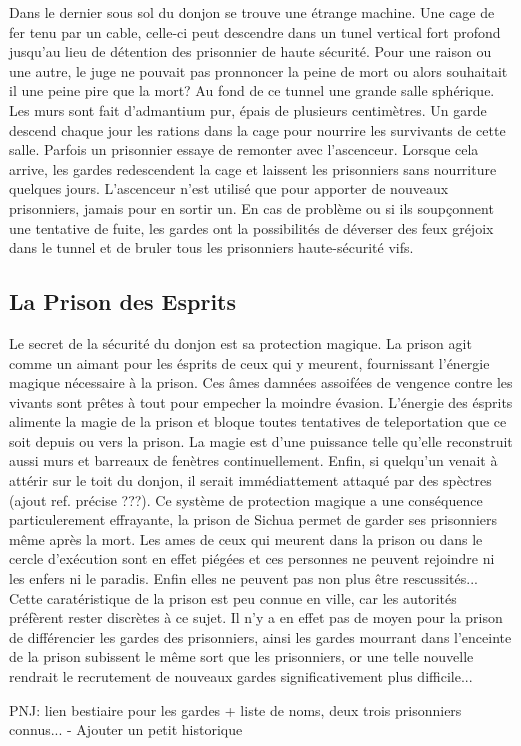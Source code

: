 Dans le dernier sous sol du donjon se trouve une étrange machine. Une cage de fer tenu 
par un cable, celle-ci peut descendre dans un tunel vertical fort profond
jusqu'au lieu de détention des prisonnier de haute sécurité. Pour une 
raison ou une autre, le juge ne pouvait pas pronnoncer la peine de mort
ou alors souhaitait il une peine pire que la mort? Au fond de ce tunnel une grande
salle sphérique. Les murs sont fait d'admantium pur, épais de plusieurs 
centimètres. Un garde descend chaque jour les rations dans la cage pour nourrire les 
survivants de cette salle. Parfois un prisonnier 
essaye de remonter avec l'ascenceur. Lorsque cela arrive, les gardes redescendent la cage et 
laissent les prisonniers sans nourriture quelques jours. L'ascenceur n'est utilisé
que pour apporter de nouveaux prisonniers, jamais pour en sortir un. En cas de
problème ou si ils soupçonnent une tentative de fuite, les gardes ont la possibilités 
de déverser des feux gréjoix dans le tunnel et de bruler tous les prisonniers 
haute-sécurité vifs.

\subsection{La Prison des Esprits}

Le secret de la sécurité du donjon est sa protection magique. La prison
agit comme un aimant pour les ésprits de ceux qui y meurent, fournissant
l'énergie magique nécessaire à la prison. Ces âmes damnées assoifées de vengence
contre les vivants sont prêtes à tout 
pour empecher la moindre évasion. L'énergie des ésprits alimente la magie de 
la prison et bloque toutes 
tentatives de teleportation que ce soit depuis ou vers la prison. La magie est d'une
puissance telle qu'elle reconstruit aussi murs et barreaux de fenètres
continuellement. Enfin, si quelqu'un venait à attérir sur le toit du donjon, il 
serait immédiattement attaqué par des spèctres (ajout ref. précise ???).
Ce système de protection magique a une conséquence particulerement effrayante,
la prison de Sichua permet de garder ses prisonniers même après la mort.
Les ames de
ceux qui meurent dans la prison ou dans le cercle d'exécution sont en effet piégées et
ces personnes ne peuvent rejoindre ni les enfers ni le paradis. Enfin elles ne
peuvent pas non plus être rescussités... Cette caratéristique de la prison est peu connue
en ville, car les autorités préfèrent rester discrètes à ce sujet. Il n'y a
en effet pas de moyen pour la prison de différencier les
gardes des prisonniers, ainsi les gardes mourrant dans l'enceinte de la prison
subissent le même sort que les prisonniers, or une telle nouvelle rendrait le 
recrutement de nouveaux gardes significativement plus difficile...


PNJ: lien bestiaire pour les 
gardes + liste de noms, deux trois prisonniers connus...
- Ajouter un petit historique



